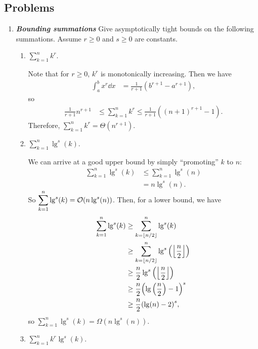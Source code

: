 \documentclass[AppendixA]{subfiles}
\begin{document}
	\subsection*{Problems}

	\begin{enumerate}[leftmargin=\labelsep,label={\textbf{\thesection-\arabic*}}]
		\item \textbf{\textit{Bounding summations}} Give asymptotically tight bounds on the following summations. Assume $r \geq 0$ and $s \geq 0$ are constants.
		\begin{enumerate}
			\item $\displaystyle \sum_{k = 1}^n k^r$.
			\begin{answer}
				Note that for $r \geq 0$, $k^r$ is monotonically increasing. Then we have
				\begin{align*}
					\int_a^b x^r \dd x &= \frac{1}{r + 1}(b^{r + 1} - a^{r + 1}),
				\end{align*}
				so
				\begin{align*}
					\frac{1}{r + 1} n^{r + 1} &\leq \sum_{k = 1}^n k^r \leq \frac{1}{r + 1}((n + 1)^{r + 1} - 1).
				\end{align*}
				Therefore, $\displaystyle \sum_{k = 1}^n k^r = \Theta(n^{r + 1})$.
			\end{answer}

			\item \label{exer:appA-log-sum-bound} $\displaystyle \sum_{k = 1}^n \lg^s(k)$.
			\begin{answer}
				We can arrive at a good upper bound by simply ``promoting'' $k$ to $n$:
				\begin{align*}
					\sum_{k = 1}^n \lg^s(k) &\leq \sum_{k = 1}^n \lg^s(n)\\
						&= n\lg^s(n).
				\end{align*}
				So $\displaystyle \sum_{k = 1}^n \lg^s(k) = \mathcal{O}(n\lg^s(n))$. Then, for a lower bound, we have
				\begin{align*}
					\sum_{k = 1}^n \lg^s(k) &\geq \sum_{k = \lfloor n / 2 \rfloor}^n \lg^s(k)\\
						&\geq \sum_{k = \lfloor n / 2 \rfloor}^n \lg^s \qty(\left\lfloor \frac{n}{2} \right\rfloor)\\
						&\geq \frac{n}{2} \lg^s\qty(\left\lfloor \frac{n}{2} \right\rfloor)\\
						&\geq \frac{n}{2} \qty(\lg \qty(\frac{n}{2}) - 1)^s\\
						&\geq \frac{n}{2} \qty(\lg(n) - 2)^s,
				\end{align*}
				so $\displaystyle \sum_{k = 1}^n \lg^s(k) = \Omega(n\lg^s(n))$.
			\end{answer}
			
			\item $\displaystyle \sum_{k = 1}^n k^r\lg^s(k)$.
			\begin{answer}
				
			\end{answer}
			
		\end{enumerate}
	\end{enumerate}
\end{document}
